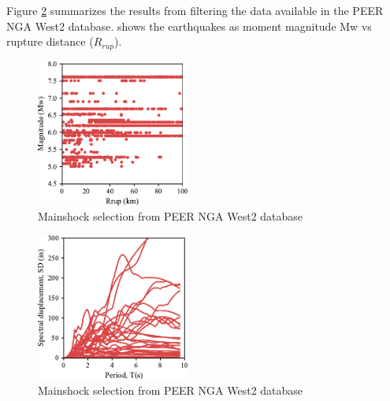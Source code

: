 Figure \ref{fig:MS_Selection} summarizes the results from filtering the data available in the PEER NGA West2 database.  shows the earthquakes as moment magnitude {Mw} vs rupture distance ($R_{rup}$).


\begin{figure}[htbp]
	\centering
	\includegraphics[width=0.45\textwidth]{Chapter-5/figs/GM_Selection.pdf}
	\caption{Mainshock selection from PEER NGA West2 database}
	\label{fig:MS_Selection}
\end{figure}
\begin{figure}[htbp]
	\centering
	\includegraphics[width=0.45\textwidth]{Chapter-5/figs/SD_Spectrum_GM_Selection.pdf}
	\caption{Mainshock selection from PEER NGA West2 database}
	\label{fig:MS_Selection}
\end{figure}

